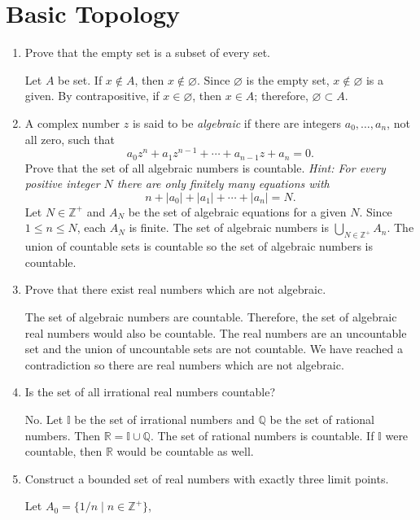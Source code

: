 \chapter{Basic Topology}

\begin{enumerate}
\item
  Prove that the empty set is a subset of every set.
  \par\smallskip
  Let \(A\) be set.
  If \(x\not\in A\), then \(x\not\in\varnothing\).
  Since \(\varnothing\) is the empty set, \(x\not\in\varnothing\) is a given.
  By contrapositive, if \(x\in\varnothing\), then \(x\in A\); therefore,
  \(\varnothing\subset A\).
\item
  A complex number \(z\) is said to be \textit{algebraic} if there are integers
  \(a_0,\ldots,a_n\), not all zero, such that
  \[
  a_0z^n + a_1z^{n - 1} + \cdots + a_{n - 1}z + a_n = 0.
  \]
  Prove that the set of all algebraic numbers is countable.
  \textit{Hint: For every positive integer \(N\) there are only finitely many
    equations with}
  \[
  n + \lvert a_0\rvert + \lvert a_1\rvert + \cdots + \lvert a_n\rvert = N.
  \]
  Let \(N\in\mathbb{Z}^+\) and \(A_N\) be the set of algebraic equations for a
  given \(N\).
  Since \(1\leq n\leq N\), each \(A_N\) is finite.
  The set of algebraic numbers is \(\bigcup_{N\in\mathbb{Z}^+}A_n\).
  The union of countable sets is countable so the set of algebraic numbers is
  countable.
\item
  Prove that there exist real numbers which are not algebraic.
  \par\smallskip
  The set of algebraic numbers are countable.
  Therefore, the set of algebraic real numbers would also be countable.
  The real numbers are an uncountable set and the union of uncountable sets are
  not countable. We have reached a contradiction so there are real numbers which
  are not algebraic.
\item
  Is the set of all irrational real numbers countable?
  \par\smallskip
  No.
  Let \(\mathbb{I}\) be the set of irrational numbers and \(\mathbb{Q}\) be the
  set of rational numbers.
  Then \(\mathbb{R} = \mathbb{I}\cup\mathbb{Q}\).
  The set of rational numbers is countable.
  If \(\mathbb{I}\) were countable, then \(\mathbb{R}\) would be countable as
  well.
\item
  Construct a bounded set of real numbers with exactly three limit points.
  \par\smallskip
  Let \(A_0 = \{1/n\mid n\in\mathbb{Z}^+\}\),

\end{enumerate}
